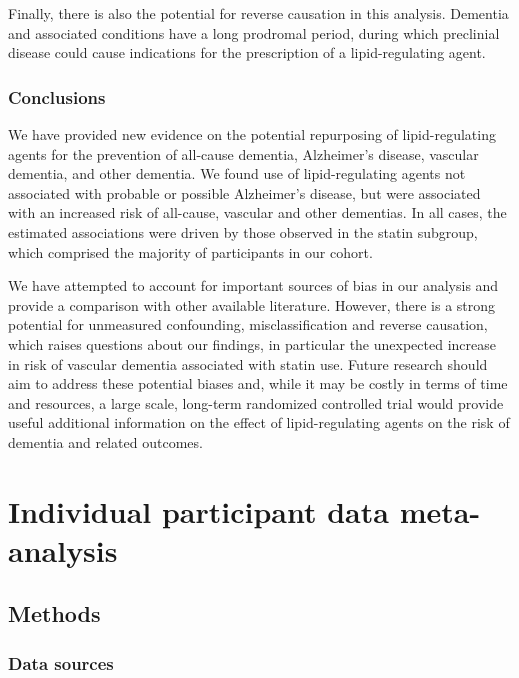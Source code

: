 \documentclass[a4paper, twoside]{templates/ociamthesis}
\begin{document}
Finally, there is also the potential for reverse causation in this analysis. Dementia and associated conditions have a long prodromal period, during which preclinial disease could cause indications for the prescription of a lipid-regulating agent.

\hypertarget{conclusions}{%
\subsection{Conclusions}\label{conclusions}}

We have provided new evidence on the potential repurposing of lipid-regulating agents for the prevention of all-cause dementia, Alzheimer's disease, vascular dementia, and other dementia. We found use of lipid-regulating agents not associated with probable or possible Alzheimer's disease, but were associated with an increased risk of all-cause, vascular and other dementias. In all cases, the estimated associations were driven by those observed in the statin subgroup, which comprised the majority of participants in our cohort.

We have attempted to account for important sources of bias in our analysis and provide a comparison with other available literature. However, there is a strong potential for unmeasured confounding, misclassification and reverse causation, which raises questions about our findings, in particular the unexpected increase in risk of vascular dementia associated with statin use. Future research should aim to address these potential biases and, while it may be costly in terms of time and resources, a large scale, long-term randomized controlled trial would provide useful additional information on the effect of lipid-regulating agents on the risk of dementia and related outcomes.

\hypertarget{ipd-heading}{%
\chapter{Individual participant data meta-analysis}\label{ipd-heading}}

\minitoc 

\hypertarget{methods-2}{%
\section{Methods}\label{methods-2}}

\hypertarget{data-sources}{%
\subsection{Data sources}\label{data-sources}}
\end{document}
